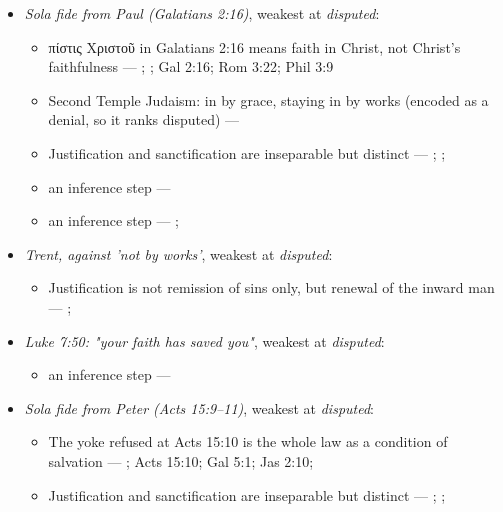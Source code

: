 \documentclass[11pt]{article}
\begin{document}
\begin{itemize}
\item \emph{Sola fide from Paul (Galatians 2:16)}, weakest at \emph{disputed}:
\begin{itemize}
\item πίστις Χριστοῦ in Galatians 2:16 means faith in Christ, not Christ's faithfulness --- \cite{dunn-once-more-pistis-christou-1991}; \cite{matlock-detheologizing-2000}; Gal 2:16; Rom 3:22; Phil 3:9
\item Second Temple Judaism: in by grace, staying in by works (encoded as a denial, so it ranks disputed) --- \cite{sanders-paul-palestinian-judaism-1977}
\item Justification and sanctification are inseparable but distinct --- \cite[XIII.1]{westminster-confession-1647}; \cite[XI.1]{westminster-confession-1647}; \cite[III.xi.6]{calvin-institutes-1960}
\item an inference step --- \cite[Trent, Session VI (1547), canon 9]{tanner-decrees-1990}
\item an inference step --- \cite{gathercole-where-boasting-2002}; \cite{carson-variegated-nomism-1-2001}
\end{itemize}
\item \emph{Trent, against 'not by works'}, weakest at \emph{disputed}:
\begin{itemize}
\item Justification is not remission of sins only, but renewal of the inward man --- \cite[Trent, Session VI (1547), Decree on Justification, ch. 7]{tanner-decrees-1990}; \cite[Trent, Session VI (1547), canon 11]{tanner-decrees-1990}
\end{itemize}
\item \emph{Luke 7:50: "your faith has saved you"}, weakest at \emph{disputed}:
\begin{itemize}
\item an inference step --- \cite[Trent, Session VI (1547), canon 9]{tanner-decrees-1990}
\end{itemize}
\item \emph{Sola fide from Peter (Acts 15:9–11)}, weakest at \emph{disputed}:
\begin{itemize}
\item The yoke refused at Acts 15:10 is the whole law as a condition of salvation --- \cite[ad loc. Acts 15:10]{bruce-acts-1988}; Acts 15:10; Gal 5:1; Jas 2:10; \cite{das-paul-law-covenant-2001}
\item Justification and sanctification are inseparable but distinct --- \cite[XIII.1]{westminster-confession-1647}; \cite[XI.1]{westminster-confession-1647}; \cite[III.xi.6]{calvin-institutes-1960}

\end{itemize}
\end{itemize}
\end{document}
